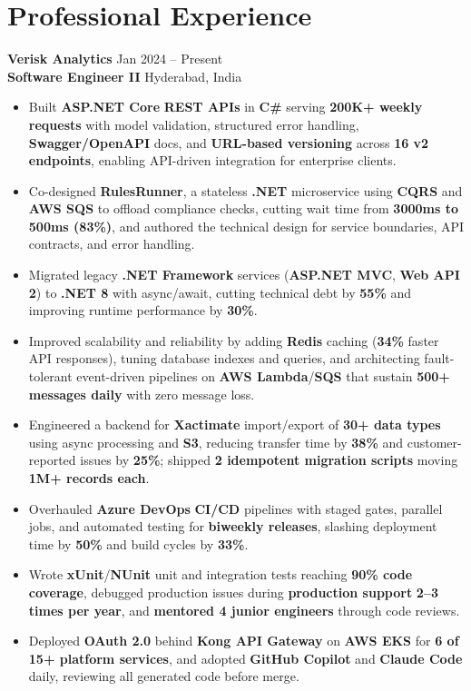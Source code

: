 \documentclass[a4paper,10pt]{article}
\begin{document}
\section*{Professional Experience}

\textbf{Verisk Analytics} \hfill Jan 2024 -- Present \\
\textbf{Software Engineer II} \hfill Hyderabad, India

\begin{itemize}[leftmargin=*]
    \item Built \textbf{ASP.NET Core} \textbf{REST APIs} in \textbf{C\#} serving \textbf{200K+ weekly requests} with model validation, structured error handling, \textbf{Swagger/OpenAPI} docs, and \textbf{URL-based versioning} across \textbf{16 v2 endpoints}, enabling API-driven integration for enterprise clients.
    \item Co-designed \textbf{RulesRunner}, a stateless \textbf{.NET} microservice using \textbf{CQRS} and \textbf{AWS SQS} to offload compliance checks, cutting wait time from \textbf{3000ms to 500ms (83\%)}, and authored the technical design for service boundaries, API contracts, and error handling.
    \item Migrated legacy \textbf{.NET Framework} services (\textbf{ASP.NET MVC}, \textbf{Web API 2}) to \textbf{.NET 8} with async/await, cutting technical debt by \textbf{55\%} and improving runtime performance by \textbf{30\%}.
    \item Improved scalability and reliability by adding \textbf{Redis} caching (\textbf{34\%} faster API responses), tuning database indexes and queries, and architecting fault-tolerant event-driven pipelines on \textbf{AWS Lambda}/\textbf{SQS} that sustain \textbf{500+ messages daily} with zero message loss.
    \item Engineered a backend for \textbf{Xactimate} import/export of \textbf{30+ data types} using async processing and \textbf{S3}, reducing transfer time by \textbf{38\%} and customer-reported issues by \textbf{25\%}; shipped \textbf{2 idempotent migration scripts} moving \textbf{1M+ records each}.
    \item Overhauled \textbf{Azure DevOps} \textbf{CI/CD} pipelines with staged gates, parallel jobs, and automated testing for \textbf{biweekly releases}, slashing deployment time by \textbf{50\%} and build cycles by \textbf{33\%}.
    \item Wrote \textbf{xUnit}/\textbf{NUnit} unit and integration tests reaching \textbf{90\% code coverage}, debugged production issues during \textbf{production support} \textbf{2--3 times per year}, and \textbf{mentored 4 junior engineers} through code reviews.
    \item Deployed \textbf{OAuth 2.0} behind \textbf{Kong API Gateway} on \textbf{AWS EKS} for \textbf{6 of 15+ platform services}, and adopted \textbf{GitHub Copilot} and \textbf{Claude Code} daily, reviewing all generated code before merge.
\end{itemize}
\end{document}
